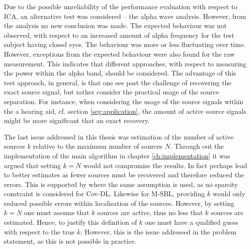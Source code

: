 Due to the possible unreliability of the performance evaluation with respect to ICA, an alternative test was considered -- the alpha wave analysis. 
However, from the analysis no new conclusion was made. The expected behaviour was not observed, with respect to an increased amount of alpha frequency for the test subject having closed eyes.
The behaviour was more or less fluctuating over time. However, exceptions from the expected behaviour were also found for the raw measurement. This indicates that different approaches, with respect to measuring the power within the alpha band, should be considered.
The advantage of this test approach, in general, is that one see past the challenge of recovering the exact source signal, but rather consider the practical usage of the source separation. For instance, when considering the usage of the source signals within the a hearing aid, cf. section \ref{seg:application}, the amount of active source signals might be more significant that an exact recovery.         

The last issue addressed in this thesis was estimation of the number of active sources $k$ relative to the maximum number of sources $N$. Through out the implementation of the main algorithm in chapter \ref{ch:implementation} it was argued that setting $k = N$ would not compromise the results. 
In fact perhaps lead to better estimates as fewer sources must be recovered and therefore reduced the errors.
This is supported by \cite{Balkan2015} where the same assumption is used, as no sparsity constraint is considered for Cov-DL. 
Likewise for M-SBL, providing $k$ would only reduced possible errors within localisation of the sources.
However, by setting $k = N$ one must assume that $k$ sources are active, thus no less that $k$ sources are estimated. 
Hence, to justify this definition of $k$ one must have a qualified guess with respect to the true $k$. 
However, this is the issue addressed in the problem statement, as this is not possible in practice.    

